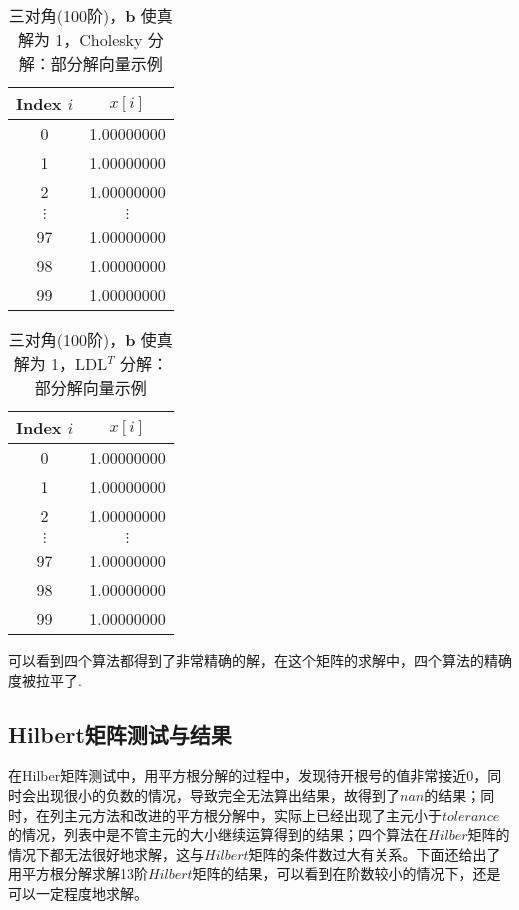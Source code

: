 \documentclass[UTF8]{ctexart}
\begin{document}
  \begin{table}[ht]
  \centering
  \caption{三对角(100阶)，$\mathbf{b}$ 使真解为 1，Cholesky 分解：部分解向量示例}
  \label{tab:tri100-onesolution-cholesky}
  \begin{tabular}{cc}
  \toprule
  \textbf{Index} $i$ & $x[i]$ \\
  \midrule
  0   &  1.00000000  \\
  1   &  1.00000000  \\
  2   &  1.00000000 \\
  $\vdots$ & $\vdots$ \\
  97  &  1.00000000  \\
  98  &  1.00000000  \\
  99  &  1.00000000  \\
  \bottomrule
  \end{tabular}
  \end{table}
  
  \begin{table}[ht]
  \centering
  \caption{三对角(100阶)，$\mathbf{b}$ 使真解为 1，LDL$^T$ 分解：部分解向量示例}
  \label{tab:tri100-onesolution-LDLT}
  \begin{tabular}{cc}
  \toprule
  \textbf{Index} $i$ & $x[i]$ \\
  \midrule
  0   &  1.00000000 \\
  1   &  1.00000000  \\
  2   &  1.00000000  \\
  $\vdots$ & $\vdots$ \\
  97  &  1.00000000  \\
  98  &  1.00000000  \\
  99  &  1.00000000 \\
  \bottomrule
  \end{tabular}
  \end{table}

可以看到四个算法都得到了非常精确的解，在这个矩阵的求解中，四个算法的精确度被拉平了.

\clearpage

\subsection{Hilbert矩阵测试与结果}

在Hilber矩阵测试中，用平方根分解的过程中，发现待开根号的值非常接近$0$，同时会出现很小的负数的情况，导致完全无法算出结果，故得到了$nan$的结果；同时，在列主元方法和改进的平方根分解中，实际上已经出现了主元小于$tolerance$的情况，列表中是不管主元的大小继续运算得到的结果；四个算法在$Hilber$矩阵的情况下都无法很好地求解，这与$Hilbert$矩阵的条件数过大有关系。下面还给出了用平方根分解求解13阶$Hilbert$矩阵的结果，可以看到在阶数较小的情况下，还是可以一定程度地求解。
\end{document}
